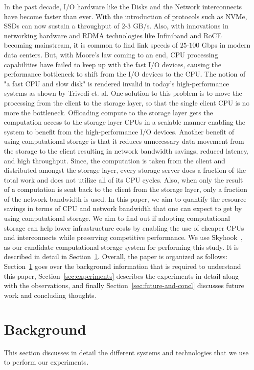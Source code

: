 \documentclass[11pt]{article}
\begin{document}
In the past decade, I/O hardware like the Disks and the Network interconnects have become faster than ever. With the introduction of protocols such as NVMe, SSDs can now sustain a throughput of $2$-$3$ GB/s. Also, with innovations in networking hardware and RDMA technologies like Infiniband and RoCE becoming mainstream, it is common to find link speeds of $25$-$100$ Gbps in modern data centers. But, with Moore's law coming to an end, CPU processing capabilities have failed to keep up with the fast I/O devices, causing the performance bottleneck to shift from the I/O devices to the CPU. The notion of "a fast CPU and slow disk" is rendered invalid in today's high-performance systems as shown by Trivedi et. al. One solution to this problem is to move the processing from the client to the storage layer, so that the single client CPU is no more the bottleneck. Offloading compute to the storage layer gets the computation access to the storage layer CPUs in a scalable manner enabling the system to benefit from the high-performance I/O devices. Another benefit of using computational storage is that it reduces unnecessary data movement from the storage to the client resulting in network bandwidth savings, reduced latency, and high throughput. Since, the computation is taken from the client and distributed amongst the storage layer, every storage server does a fraction of the total work and does not utilize all of its CPU cycles. Also, when only the result of a computation is sent back to the client from the storage layer, only a fraction of the network bandwidth is used. In this paper, we aim to quantify the resource savings in terms of CPU and network bandwidth that one can expect to get by using computational storage. We aim to find out if adopting computational storage can help lower infrastructure costs by enabling the use of cheaper CPUs and interconnects while preserving competitive performance. We use Skyhook~\cite{chakraborty2022skyhook}, as our candidate computational storage system for performing this study. It is described in detail in Section~\ref{sec:background}. Overall, the paper is organized as follows: Section~\ref{sec:background} goes over the background information that is required to understand this paper, Section~\ref{sec:experiments} describes the experiments in detail along with the observations, and finally Section~\ref{sec:future-and-concl} discusses future work and concluding thoughts.

\section{Background}
\label{sec:background}
This section discusses in detail the different systems and technologies that we use to perform our experiments.
\end{document}
